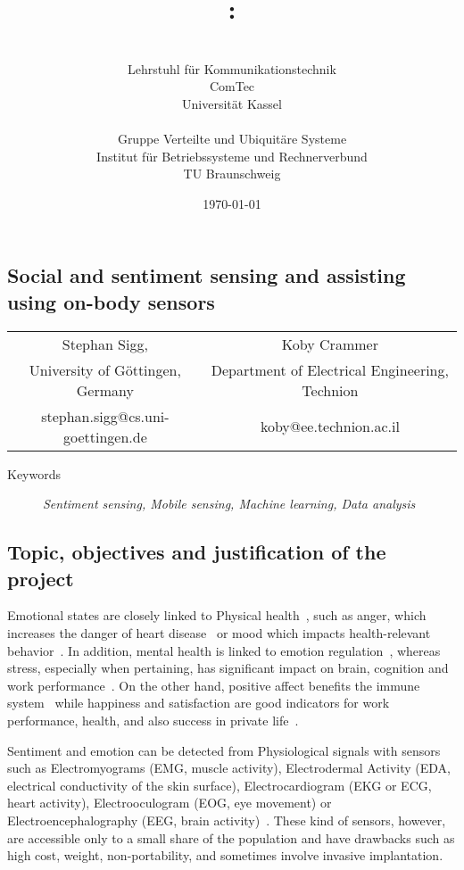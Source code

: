 \documentclass[12pt]{article}
\author{\begin{minipage}[t]{7.1cm}\centering \small \VornameAntragstellerA\ \NachnameAntragstellerA\\ \small Lehrstuhl für Kommunikationstechnik\\ \small ComTec\\ \small Universität Kassel\end{minipage}
\begin{minipage}[t]{7.1cm}\centering \small \VornameAntragstellerB\ \NachnameAntragstellerB\\ \small Gruppe Verteilte und Ubiquitäre Systeme \\ \small Institut für Betriebssysteme und Rechnerverbund\\ \small TU Braunschweig\end{minipage}}
\title{\projektname:\\\notiz{Social and sentiment sensing and assisting using on-body sensors}}
\date{\small \today}
\begin{document}
\onehalfspacing %
\setcounter{secnumdepth}{5}
\pagebreak
\begin{center}
\section*{Social and sentiment sensing and assisting using on-body sensors}
\begin{tabular}{cc}
  Stephan Sigg, & Koby Crammer\\
  University of Göttingen, Germany & Department of Electrical Engineering, Technion \\
 stephan.sigg@cs.uni-goettingen.de & koby@ee.technion.ac.il
\end{tabular}

\end{center}
\begin{description}
	\item[Keywords] \textit{Sentiment sensing, Mobile sensing, Machine learning, Data analysis}
\end{description}

\subsection*{Topic, objectives and justification of the project}
Emotional states are closely linked to Physical health~\cite{SentimentSensing_Salovey_2000}, such as anger, which increases the danger of heart disease~\cite{SentimentSensing_Smith_2004} or mood which impacts health-relevant behavior~\cite{SentimentSensing_Todaro_2003}.
In addition, mental health is linked to emotion regulation~\cite{SentimentSensing_Gross_1995}, whereas stress, especially when pertaining, has significant impact on brain, cognition and work performance~\cite{SentimentSensing_Lupien_2009}.
On the other hand, positive affect benefits the immune system~\cite{SentimentSensing_Smith_2004} while happiness and satisfaction are good indicators for work performance, health, and also success in private life~\cite{SentimentSensing_Lyubomirsky_2005}.

Sentiment and emotion can be detected from Physiological signals with sensors such as Electromyograms (EMG, muscle activity), Electrodermal Activity (EDA, electrical conductivity of the skin surface), Electrocardiogram (EKG or ECG, heart activity), Electrooculogram (EOG, eye movement) or Electroencephalography (EEG, brain activity)~\cite{SentimentSensing_Calvo_2010}.
These kind of sensors, however, are accessible only to a small share of the population and have drawbacks such as high cost, weight, non-portability, and sometimes involve invasive implantation.
\end{document}
